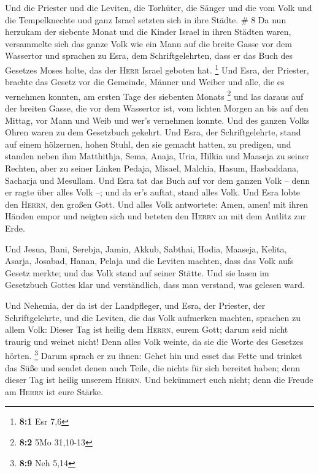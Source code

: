  Und die Priester und die Leviten, die Torhüter, die
Sänger und die vom Volk und die Tempelknechte und ganz Israel setzten
sich in ihre Städte. \# 8  Da nun herzukam der siebente
Monat und die Kinder Israel in ihren Städten waren, versammelte sich das
ganze Volk wie ein Mann auf die breite Gasse vor dem Wassertor und
sprachen zu Esra, dem Schriftgelehrten, dass er das Buch des Gesetzes
Moses holte, das der \textsc{Herr} Israel geboten hat. \footnote{\textbf{8:1}
  Esr 7,6}  Und Esra, der Priester, brachte das Gesetz vor
die Gemeinde, Männer und Weiber und alle, die es vernehmen konnten, am
ersten Tage des siebenten Monats \footnote{\textbf{8:2} 5Mo 31,10-13}
 und las daraus auf der breiten Gasse, die vor dem
Wassertor ist, vom lichten Morgen an bis auf den Mittag, vor Mann und
Weib und wer's vernehmen konnte. Und des ganzen Volks Ohren waren zu dem
Gesetzbuch gekehrt.  Und Esra, der Schriftgelehrte, stand
auf einem hölzernen, hohen Stuhl, den sie gemacht hatten, zu predigen,
und standen neben ihm Matthithja, Sema, Anaja, Uria, Hilkia und Maaseja
zu seiner Rechten, aber zu seiner Linken Pedaja, Misael, Malchia, Hasum,
Hasbaddana, Sacharja und Mesullam.  Und Esra tat das Buch
auf vor dem ganzen Volk -- denn er ragte über alles Volk --; und da er's
auftat, stand alles Volk.  Und Esra lobte den
\textsc{Herrn}, den großen Gott. Und alles Volk antwortete: Amen, amen!
mit ihren Händen empor und neigten sich und beteten den \textsc{Herrn}
an mit dem Antlitz zur Erde.

 Und Jesua, Bani, Serebja, Jamin, Akkub, Sabthai, Hodia,
Maaseja, Kelita, Asarja, Josabad, Hanan, Pelaja und die Leviten machten,
dass das Volk aufs Gesetz merkte; und das Volk stand auf seiner Stätte.
 Und sie lasen im Gesetzbuch Gottes klar und verständlich,
dass man verstand, was gelesen ward.

 Und Nehemia, der da ist der Landpfleger, und Esra, der
Priester, der Schriftgelehrte, und die Leviten, die das Volk aufmerken
machten, sprachen zu allem Volk: Dieser Tag ist heilig dem
\textsc{Herrn}, eurem Gott; darum seid nicht traurig und weinet nicht!
Denn alles Volk weinte, da sie die Worte des Gesetzes hörten.
\footnote{\textbf{8:9} Neh 5,14}  Darum sprach er zu
ihnen: Gehet hin und esset das Fette und trinket das Süße und sendet
denen auch Teile, die nichts für sich bereitet haben; denn dieser Tag
ist heilig unserem \textsc{Herrn}. Und bekümmert euch nicht; denn die
Freude am \textsc{Herrn} ist eure Stärke.

